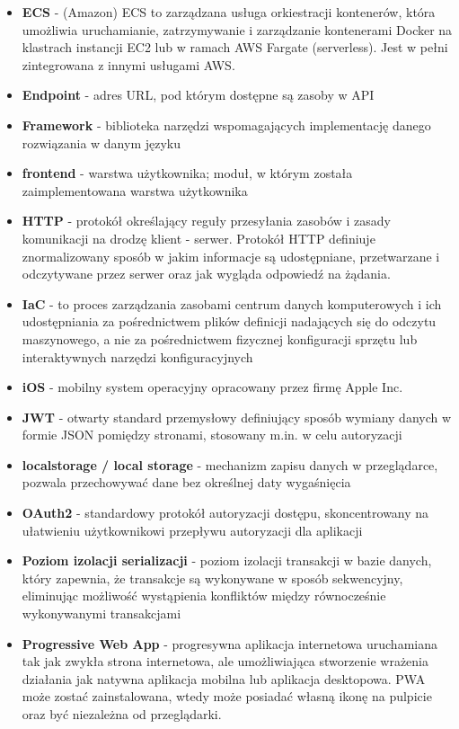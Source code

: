 \documentclass[../main.tex]{subfiles}
\begin{document}
\begin{itemize}
        \item \textbf{ECS} - (Amazon) ECS to zarządzana usługa orkiestracji kontenerów, która umożliwia uruchamianie, zatrzymywanie i zarządzanie kontenerami Docker na klastrach instancji EC2 lub w ramach AWS Fargate (serverless). Jest w pełni zintegrowana z innymi usługami AWS.
        \item \textbf{Endpoint} - adres URL, pod którym dostępne są zasoby w API
        \item \textbf{Framework} - biblioteka narzędzi wspomagających implementację danego rozwiązania w danym języku
        \item \textbf{frontend} - warstwa użytkownika; moduł, w którym została zaimplementowana warstwa użytkownika
        \item \textbf{HTTP} - protokół określający reguły przesyłania zasobów i zasady komunikacji na drodzę klient - serwer. Protokół HTTP definiuje znormalizowany sposób w jakim informacje są udostępniane, przetwarzane i odczytywane przez serwer oraz jak wygląda odpowiedź na żądania. \cite{ks-http}
        \item \textbf{IaC} - to proces zarządzania zasobami centrum danych komputerowych i ich udostępniania za pośrednictwem plików definicji nadających się do odczytu maszynowego, a nie za pośrednictwem fizycznej konfiguracji sprzętu lub interaktywnych narzędzi konfiguracyjnych
        \item \textbf{iOS} - mobilny system operacyjny opracowany przez firmę Apple Inc.
        \item \textbf{JWT} - otwarty standard przemysłowy definiujący sposób wymiany danych w formie JSON pomiędzy stronami, stosowany m.in. w celu autoryzacji
        \item \textbf{localstorage / local storage} - mechanizm zapisu danych w przeglądarce, pozwala przechowywać dane bez określnej daty wygaśnięcia
        \item \textbf{OAuth2} - standardowy protokół autoryzacji dostępu, skoncentrowany na ułatwieniu użytkownikowi przepływu autoryzacji dla aplikacji
        \item \textbf{Poziom izolacji serializacji} - poziom izolacji transakcji w bazie danych, który zapewnia, że transakcje są wykonywane w sposób sekwencyjny, eliminując możliwość wystąpienia konfliktów między równocześnie wykonywanymi transakcjami
        \item \textbf{Progressive Web App} - progresywna aplikacja internetowa uruchamiana tak jak zwykła strona internetowa, ale umożliwiająca stworzenie wrażenia działania jak natywna aplikacja mobilna lub aplikacja desktopowa. PWA może zostać zainstalowana, wtedy może posiadać własną ikonę na pulpicie oraz być niezależna od przeglądarki.

\end{itemize}
\end{document}
